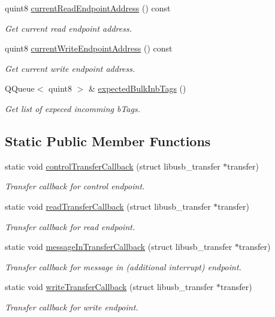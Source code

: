 \begin{DoxyCompactItemize}
quint8 \hyperlink{classmdt_usb_port_a860e89069ba433e6174c032a28d0eae2}{currentReadEndpointAddress} () const 
\begin{DoxyCompactList}\small\item\em Get current read endpoint address. \end{DoxyCompactList}\item 
quint8 \hyperlink{classmdt_usb_port_ae2319ee6ff5a2f4399410175fbac6a44}{currentWriteEndpointAddress} () const 
\begin{DoxyCompactList}\small\item\em Get current write endpoint address. \end{DoxyCompactList}\item 
QQueue$<$ quint8 $>$ \& \hyperlink{classmdt_usb_port_a0ad07939f4709240b0c79c501edc9498}{expectedBulkInbTags} ()
\begin{DoxyCompactList}\small\item\em Get list of expeced incomming bTags. \end{DoxyCompactList}\end{DoxyCompactItemize}
\subsection*{Static Public Member Functions}
\begin{DoxyCompactItemize}
\item 
static void \hyperlink{classmdt_usb_port_a84ddd2d0bf77b4db60358846c7da4853}{controlTransferCallback} (struct libusb\_\-transfer $\ast$transfer)
\begin{DoxyCompactList}\small\item\em Transfer callback for control endpoint. \end{DoxyCompactList}\item 
static void \hyperlink{classmdt_usb_port_ab4f1f0456c84f954604b192f6085c3f2}{readTransferCallback} (struct libusb\_\-transfer $\ast$transfer)
\begin{DoxyCompactList}\small\item\em Transfer callback for read endpoint. \end{DoxyCompactList}\item 
static void \hyperlink{classmdt_usb_port_ae8932368e2777356695ab69f6ed08f41}{messageInTransferCallback} (struct libusb\_\-transfer $\ast$transfer)
\begin{DoxyCompactList}\small\item\em Transfer callback for message in (additional interrupt) endpoint. \end{DoxyCompactList}\item 
static void \hyperlink{classmdt_usb_port_af910071a5a5c401cd20cee3519120cc2}{writeTransferCallback} (struct libusb\_\-transfer $\ast$transfer)
\begin{DoxyCompactList}\small\item\em Transfer callback for write endpoint. \end{DoxyCompactList}\end{DoxyCompactItemize}


